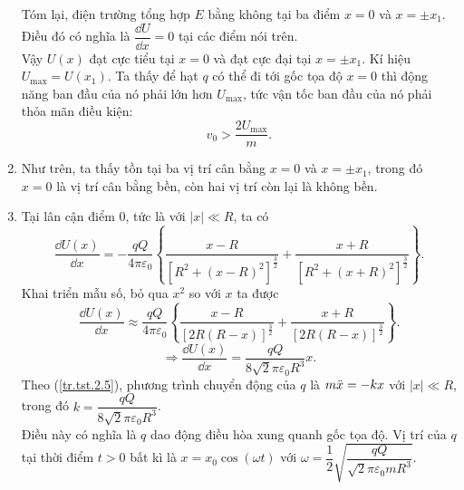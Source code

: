 \begin{loigiai}
\begin{enumerate}[1)]
\begin{center}
        \end{center}
        Tóm lại, điện trường tổng hợp $E$ bằng không tại ba điểm $x=0$ và $x=\pm x_1$. Điều đó có nghĩa là $\dfrac{\dd U}{\dd x}=0$ tại các điểm nói trên.
        \\Vậy $U(x)$ đạt cực tiểu tại $x=0$ và đạt cực đại tại $x=\pm x_1$. Kí hiệu $U_{\max}=U(x_1)$. Ta thấy để hạt $q$ có thể đi tới gốc tọa độ $x=0$ thì động năng ban đầu của nó phải lớn hơn $U_{\max}$, tức vận tốc ban đầu của nó phải thỏa mãn điều kiện: \[v_0>\dfrac{2U_{\max}}{m}.\]
        \item Như trên, ta thấy tồn tại ba vị trí cân bằng $x=0$ và $x=\pm x_1$, trong đó $x=0$ là vị trí cân bằng bền, còn hai vị trí còn lại là không bền.
        \item Tại lân cận điểm 0, tức là với $|x|\ll R$, ta có
        \[\dfrac{{\dd U(x)}}{{\dd x}} =  - \dfrac{{qQ}}{{4\pi {\varepsilon _0}}}\left\{ {\dfrac{{x - R}}{{{{\left[ {{R^2} + {{\left( {x - R} \right)}^2}} \right]}^{\frac{3}{2}}}}} + \dfrac{{x + R}}{{{{\left[ {{R^2} + {{\left( {x + R} \right)}^2}} \right]}^{\frac{3}{2}}}}}} \right\}.\]
        Khai triển mẫu số, bỏ qua $x^2$ so với $x$ ta được
        \[\dfrac{{\dd U(x)}}{{\dd x}} \approx \dfrac{{qQ}}{{4\pi {\varepsilon _0}}}\left\{ {\dfrac{{x - R}}{{{{\left[ {2{{R}}\left( {R - x} \right)} \right]}^{\frac{3}{2}}}}} + \dfrac{{x + R}}{{{{\left[ {2{{R}}\left( {R - x} \right)} \right]}^{\frac{3}{2}}}}}} \right\}.\]
        \[ \Rightarrow \dfrac{{\dd U(x)}}{{\dd x}} = \dfrac{{qQ}}{{8\sqrt 2 \pi {\varepsilon _0}{R^3}}}x. \tag{5} \label{tr.tst.2.5}\]
        Theo (\ref{tr.tst.2.5}), phương trình chuyển động của $q$ là $m\Ddot{x}=-kx$ với $|x|\ll R$, trong đó $k=\dfrac{{qQ}}{{8\sqrt 2 \pi {\varepsilon _0}{R^3}}}$.
        \\Điều này có nghĩa là $q$ dao động điều hòa xung quanh gốc tọa độ. Vị trí của $q$ tại thời điểm $t>0$ bất kì là $x=x_0 \cos{(\omega t)}$ với $\omega  = \dfrac{1}{2}\sqrt {\dfrac{{qQ}}{{\sqrt 2 \pi {\varepsilon _0}m{{{R}}^3}}}}$.
     \end{enumerate}
\end{loigiai}


